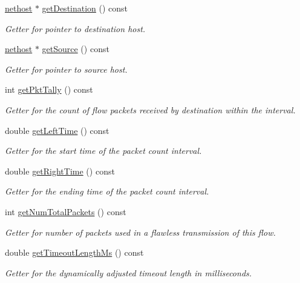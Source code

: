 \begin{DoxyCompactItemize}
\hyperlink{classnethost}{nethost} $\ast$ \hyperlink{classnetflow_a07af3290478934720fd1500f89c5586d}{get\-Destination} () const 
\begin{DoxyCompactList}\small\item\em Getter for pointer to destination host. \end{DoxyCompactList}\item 
\hyperlink{classnethost}{nethost} $\ast$ \hyperlink{classnetflow_a8a2f81127fcecaafeb83570dfb77d669}{get\-Source} () const 
\begin{DoxyCompactList}\small\item\em Getter for pointer to source host. \end{DoxyCompactList}\item 
int \hyperlink{classnetflow_a248e9f4bf73f873608bed283a7897340}{get\-Pkt\-Tally} () const 
\begin{DoxyCompactList}\small\item\em Getter for the count of flow packets received by destination within the interval. \end{DoxyCompactList}\item 
double \hyperlink{classnetflow_a21b2e6d775c5d8eab0adff3f238a41fc}{get\-Left\-Time} () const 
\begin{DoxyCompactList}\small\item\em Getter for the start time of the packet count interval. \end{DoxyCompactList}\item 
double \hyperlink{classnetflow_ad70e1973aa9856ec2eea2f54c578acc4}{get\-Right\-Time} () const 
\begin{DoxyCompactList}\small\item\em Getter for the ending time of the packet count interval. \end{DoxyCompactList}\item 
int \hyperlink{classnetflow_afd6c72736a88766d407f3a66871996bb}{get\-Num\-Total\-Packets} () const 
\begin{DoxyCompactList}\small\item\em Getter for number of packets used in a flawless transmission of this flow. \end{DoxyCompactList}\item 
double \hyperlink{classnetflow_a02e309d963c2bca12b77b66b890b9c66}{get\-Timeout\-Length\-Ms} () const 
\begin{DoxyCompactList}\small\item\em Getter for the dynamically adjusted timeout length in milliseconds. \end{DoxyCompactList}\item 

\end{DoxyCompactItemize}
